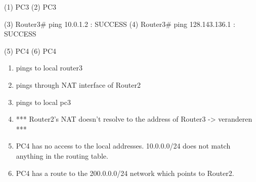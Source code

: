 (1) PC3%
(2) PC3%

(3) Router3# ping 10.0.1.2	: SUCCESS
(4) Router3# ping 128.143.136.1	: SUCCESS

(5) PC4%
(6) PC4%

\begin{enumerate}
\item pings to local router3
\item pings through NAT interface of Router2
\item pings to local pc3
\item *** Router2's NAT doesn't resolve to the address of Router3  -> veranderen ***
\item PC4 has no access to the local addresses. 10.0.0.0/24 does not match anything in the routing table.
\item PC4 has a route to the 200.0.0.0/24 network which points to Router2.
\end{enumerate}